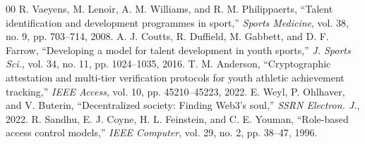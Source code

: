 \documentclass[conference]{IEEEtran}
\begin{document}
\begin{thebibliography}{00}
 R. Vaeyens, M. Lenoir, A. M. Williams, and R. M. Philippaerts, ``Talent identification and development programmes in sport,'' \textit{Sports Medicine}, vol. 38, no. 9, pp. 703--714, 2008.
 A. J. Coutts, R. Duffield, M. Gabbett, and D. F. Farrow, ``Developing a model for talent development in youth sports,'' \textit{J. Sports Sci.}, vol. 34, no. 11, pp. 1024--1035, 2016.
 T. M. Anderson, ``Cryptographic attestation and multi-tier verification protocols for youth athletic achievement tracking,'' \textit{IEEE Access}, vol. 10, pp. 45210--45223, 2022.
 E. Weyl, P. Ohlhaver, and V. Buterin, ``Decentralized society: Finding Web3's soul,'' \textit{SSRN Electron. J.}, 2022.
 R. Sandhu, E. J. Coyne, H. L. Feinstein, and C. E. Youman, ``Role-based access control models,'' \textit{IEEE Computer}, vol. 29, no. 2, pp. 38--47, 1996.
\end{thebibliography}
\end{document}
